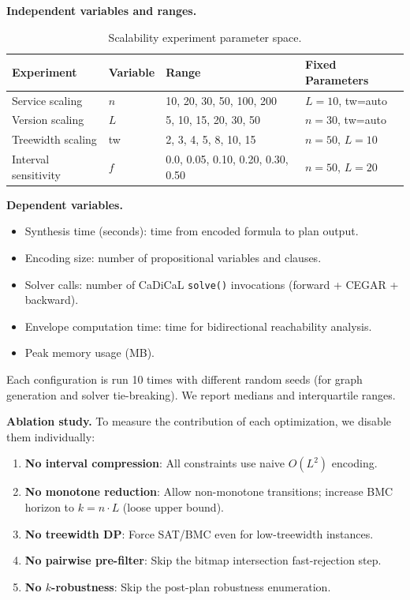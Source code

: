 \documentclass[10pt,twocolumn]{article}
\begin{document}
\textbf{Independent variables and ranges.}

\begin{table}[t]
\centering
\caption{Scalability experiment parameter space.}
\label{tab:scalability-params}
\begin{tabular}{@{}llll@{}}
\toprule
\textbf{Experiment} & \textbf{Variable} & \textbf{Range} & \textbf{Fixed Parameters} \\
\midrule
Service scaling & $n$ & 10, 20, 30, 50, 100, 200 & $L=10$, tw=auto \\
Version scaling & $L$ & 5, 10, 15, 20, 30, 50 & $n=30$, tw=auto \\
Treewidth scaling & tw & 2, 3, 4, 5, 8, 10, 15 & $n=50$, $L=10$ \\
Interval sensitivity & $f$ & 0.0, 0.05, 0.10, 0.20, 0.30, 0.50 & $n=50$, $L=20$ \\
\bottomrule
\end{tabular}
\end{table}

\textbf{Dependent variables.}
\begin{itemize}
\item Synthesis time (seconds): time from encoded formula to plan output.
\item Encoding size: number of propositional variables and clauses.
\item Solver calls: number of CaDiCaL \texttt{solve()} invocations (forward + CEGAR + backward).
\item Envelope computation time: time for bidirectional reachability analysis.
\item Peak memory usage (MB).
\end{itemize}

Each configuration is run 10 times with different random seeds (for graph generation and solver tie-breaking). We report medians and interquartile ranges.

\textbf{Ablation study.} To measure the contribution of each optimization, we disable them individually:
\begin{enumerate}
\item \textbf{No interval compression}: All constraints use naive $O(L^2)$ encoding.
\item \textbf{No monotone reduction}: Allow non-monotone transitions; increase BMC horizon to $k = n \cdot L$ (loose upper bound).
\item \textbf{No treewidth DP}: Force SAT/BMC even for low-treewidth instances.
\item \textbf{No pairwise pre-filter}: Skip the bitmap intersection fast-rejection step.
\item \textbf{No $k$-robustness}: Skip the post-plan robustness enumeration.
\end{enumerate}
\end{document}
